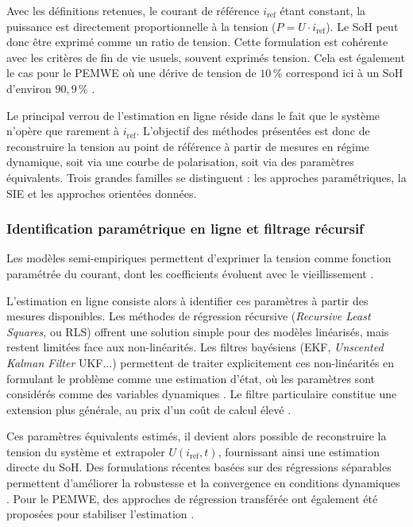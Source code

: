 Avec les définitions retenues, le courant de référence $i_{\text{ref}}$ étant constant, la puissance est directement proportionnelle à la tension ($P = U \cdot i_{\text{ref}}$). Le SoH peut donc être exprimé comme un ratio de tension. Cette formulation est cohérente avec les critères de fin de vie usuels, souvent exprimés tension. Cela est également le cas pour le PEMWE où une dérive de tension de $10\,\%$ correspond ici à un SoH d'environ $90,9\,\%$ \cite{dittmar_prognostics_2025}.

Le principal verrou de l'estimation en ligne réside dans le fait que le système n'opère que rarement à $i_{\text{ref}}$. L'objectif des méthodes présentées est donc de reconstruire la tension au point de référence à partir de mesures en régime dynamique, soit via une courbe de polarisation, soit via des paramètres équivalents. Trois grandes familles se distinguent : les approches paramétriques, la SIE et les approches orientées données.


\subsubsection{Identification paramétrique en ligne et filtrage récursif}

Les modèles semi-empiriques permettent d'exprimer la tension comme fonction paramétrée du courant, dont les coefficients évoluent avec le vieillissement \cite{hao_improved_2016, sun_pemfc_2025}.

L'estimation en ligne consiste alors à identifier ces paramètres à partir des mesures disponibles. Les méthodes de régression récursive (\textit{Recursive Least Squares}, ou RLS) offrent une solution simple pour des modèles linéarisés, mais restent limitées face aux non-linéarités. Les filtres bayésiens (EKF, \textit{Unscented Kalman Filter} UKF...) permettent de traiter explicitement ces non-linéarités en formulant le problème comme une estimation d'état, où les paramètres sont considérés comme des variables dynamiques \cite{bressel_extended_2016, pene_aging_2025}. Le filtre particulaire constitue une extension plus générale, au prix d'un coût de calcul élevé \cite{guo_marginalized_2023}.

Ces paramètres équivalents estimés, il devient alors possible de reconstruire la tension du système et extrapoler $U(i_{\text{ref}}, t)$, fournissant ainsi une estimation directe du SoH. Des formulations récentes basées sur des régressions séparables permettent d'améliorer la robustesse et la convergence en conditions dynamiques \cite{beltran_online_2024}. Pour le PEMWE, des approches de régression transférée ont également été proposées pour stabiliser l'estimation \cite{yan_state--health_2024}.

